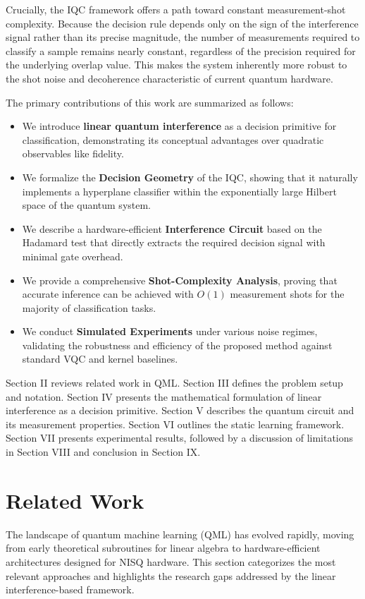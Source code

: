 \documentclass[conference]{IEEEtran}
\begin{document}
Crucially, the IQC framework offers a path toward constant measurement-shot complexity. Because the decision rule depends only on the sign of the interference signal rather than its precise magnitude, the number of measurements required to classify a sample remains nearly constant, regardless of the precision required for the underlying overlap value. This makes the system inherently more robust to the shot noise and decoherence characteristic of current quantum hardware.

The primary contributions of this work are summarized as follows:
\begin{itemize}
    \item We introduce \textbf{linear quantum interference} as a decision primitive for classification, demonstrating its conceptual advantages over quadratic observables like fidelity.
    \item We formalize the \textbf{Decision Geometry} of the IQC, showing that it naturally implements a hyperplane classifier within the exponentially large Hilbert space of the quantum system.
    \item We describe a hardware-efficient \textbf{Interference Circuit} based on the Hadamard test that directly extracts the required decision signal with minimal gate overhead.
    \item We provide a comprehensive \textbf{Shot-Complexity Analysis}, proving that accurate inference can be achieved with $O(1)$ measurement shots for the majority of classification tasks.
    \item We conduct \textbf{Simulated Experiments} under various noise regimes, validating the robustness and efficiency of the proposed method against standard VQC and kernel baselines.
\end{itemize}


Section II reviews related work in QML. Section III defines the problem setup and notation. Section IV presents the mathematical formulation of linear interference as a decision primitive. Section V describes the quantum circuit and its measurement properties. Section VI outlines the static learning framework. Section VII presents experimental results, followed by a discussion of limitations in Section VIII and conclusion in Section IX.

\section{Related Work}

The landscape of quantum machine learning (QML) has evolved rapidly, moving from early theoretical subroutines for linear algebra to hardware-efficient architectures designed for NISQ hardware. This section categorizes the most relevant approaches and highlights the research gaps addressed by the linear interference-based framework.
\end{document}
